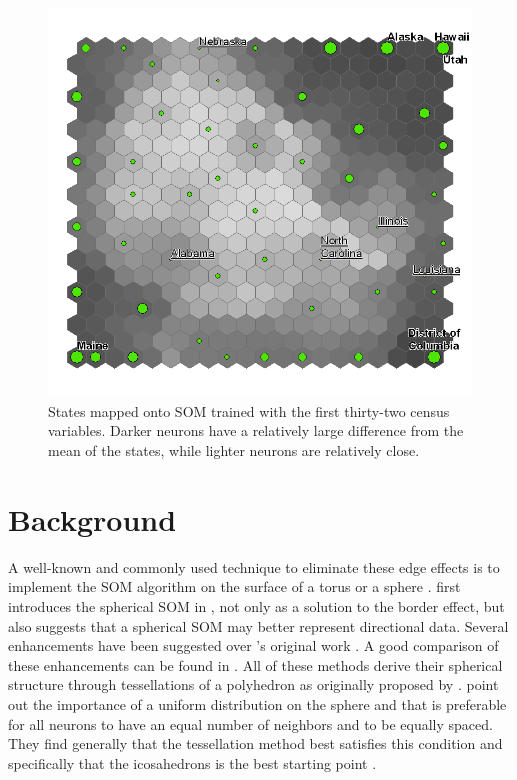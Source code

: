 \documentclass[12pt]{article}
\begin{document}
\begin{figure}
\centering
\includegraphics[width=0.85\linewidth]{gridedge.png}
\caption{States mapped onto SOM trained with the first thirty-two census
variables.  Darker neurons have a relatively large difference from the mean of
the states, while lighter neurons are relatively close.}
\label{figure1}
\end{figure}
\section{Background}

A well-known and commonly used technique to eliminate these edge effects is to
implement the SOM algorithm on the surface of a torus or a sphere \citep{ritter99}.
\citeauthor{ritter99} first introduces the spherical SOM in
\citeyear{ritter99}, not only as a solution to the border effect, but also
suggests that a spherical SOM may better represent directional data. Several
enhancements have been suggested over \citeauthor{ritter99}'s original work
\citep{Wu:2006lr,Sangole:2003lr,Nishio:2006fk,boudjemai2003}.  A good
comparison of these enhancements can be found in \citep{Wu:2006lr}.  All of
these methods derive their spherical structure through tessellations of a
polyhedron as originally proposed by \citeauthor{ritter99}.  \cite{Wu:2006lr}
point out the importance of a uniform distribution on the sphere and that is
preferable for all neurons to have an equal number of neighbors and to be
equally spaced.  They find generally that the tessellation method best
satisfies this condition and specifically that the icosahedrons is the best
starting point \citep{wu2005}.
\end{document}
